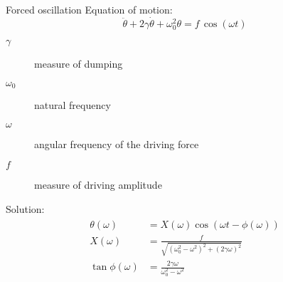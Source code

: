 \begin{frame}{Forced oscillation}
Equation of motion:
\begin{equation} \label{eq:motion-general-forced}
	\ddot{\theta}+2 \gamma \dot{\theta} + \omega_0^2 \theta = f \, \cos(\omega t)
\end{equation}

\begin{description}
\item[$\gamma$] measure of dumping
\item[$\omega_0$] natural frequency
\item[$\omega$] angular frequency of the driving force
\item[$f$] measure of driving amplitude
\end{description}
\pause
Solution:
\begin{align}
\begin{split}
\theta(\omega) &=X(\omega)\cos(\omega t - \phi(\omega)) \\
X(\omega)&=\frac{f}{\sqrt{(\omega_0^2-\omega^2)^2+(2 \gamma \omega)^2}} \\
\tan \phi(\omega)&=\frac{2\gamma \omega}{\omega_0^2-\omega^2} \\
\end{split}
\end{align}
\end{frame}


